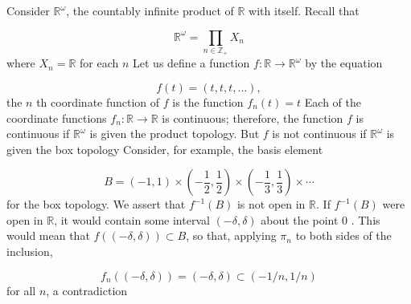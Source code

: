 \begin{centeredblock*}
\begin{example}
\label{ex:\thesection.\theexample}
 Consider \(\mathbb{R}^{\omega }\), the countably infinite product of \(\mathbb{R}\) with itself. Recall that

 \[
 \mathbb{R}^{\omega } = \mathop{\prod }\limits_{{n \in {\mathbb{Z}}_{ + }}}X_{n}
 \]
 where \(X_{n} = \mathbb{R}\) for each \(n\) Let us define a function \(f : \mathbb{R} \rightarrow {\mathbb{R}}^{\omega }\) by the equation

 \[
 f( t) = ( {t,t,t,\ldots }),
 \]
 the \(n\) th coordinate function of \(f\) is the function \(f_{n}( t) = t\) Each of the coordinate functions \(f_{n} :\mathbb{R} \rightarrow \mathbb{R}\) is continuous; therefore, the function \(f\) is continuous if \(\mathbb{R}^{\omega }\) is given the product topology. But \(f\) is not continuous if \(\mathbb{R}^{\omega }\) is given the box topology Consider, for example, the basis element

 \[
 B = ( {-1,1}) \times ( {-\frac{1}{2},\frac{1}{2}}) \times ( {-\frac{1}{3},\frac{1}{3}}) \times \cdots
 \]
 for the box topology. We assert that \(f^{-1}( B)\) is not open in \(\mathbb{R}\). If \(f^{-1}( B)\) were open in \(\mathbb{R}\), it would contain some interval \(( {-\delta,\delta })\) about the point 0 . This would mean that \(f( ( {-\delta,\delta }) ) \subset B\), so that, applying \({\pi }_{n}\) to both sides of the inclusion,

 \[
 f_{n}( ( {-\delta,\delta }) ) = ( {-\delta,\delta }) \subset ( {-1/n,1/n})
 \]
 for all \(n\), a contradiction
\end{example}
\end{centeredblock*}

